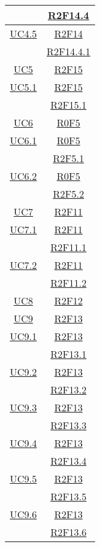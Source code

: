 \begin{longtable}{|c|c|}
& \hyperlink{R2F14.4}{R2F14.4}\\
\hline
\hyperlink{UC4.5}{UC4.5} & \hyperlink{R2F14}{R2F14}\\
& \hyperlink{R2F14.4.1}{R2F14.4.1}\\
\hline
\hyperlink{UC5}{UC5} & \hyperlink{R2F15}{R2F15}\\
\hline
\hyperlink{UC5.1}{UC5.1} & \hyperlink{R2F15}{R2F15}\\
& \hyperlink{R2F15.1}{R2F15.1}\\
\hline
\hyperlink{UC6}{UC6} & \hyperlink{R0F5}{R0F5}\\
\hline
\hyperlink{UC6.1}{UC6.1} & \hyperlink{R0F5}{R0F5}\\
& \hyperlink{R2F5.1}{R2F5.1}\\
\hline
\hyperlink{UC6.2}{UC6.2} & \hyperlink{R0F5}{R0F5}\\
& \hyperlink{R2F5.2}{R2F5.2}\\
\hline
\hyperlink{UC7}{UC7} & \hyperlink{R2F11}{R2F11}\\
\hline
\hyperlink{UC7.1}{UC7.1} & \hyperlink{R2F11}{R2F11}\\
& \hyperlink{R2F11.1}{R2F11.1}\\
\hline
\hyperlink{UC7.2}{UC7.2} & \hyperlink{R2F11}{R2F11}\\
& \hyperlink{R2F11.2}{R2F11.2}\\
\hline
\hyperlink{UC8}{UC8} & \hyperlink{R2F12}{R2F12}\\
\hline
\hyperlink{UC9}{UC9} & \hyperlink{R2F13}{R2F13}\\
\hline
\hyperlink{UC9.1}{UC9.1} & \hyperlink{R2F13}{R2F13}\\
& \hyperlink{R2F13.1}{R2F13.1}\\
\hline
\hyperlink{UC9.2}{UC9.2} & \hyperlink{R2F13}{R2F13}\\
& \hyperlink{R2F13.2}{R2F13.2}\\
\hline
\hyperlink{UC9.3}{UC9.3} & \hyperlink{R2F13}{R2F13}\\
& \hyperlink{R2F13.3}{R2F13.3}\\
\hline
\hyperlink{UC9.4}{UC9.4} & \hyperlink{R2F13}{R2F13}\\
& \hyperlink{R2F13.4}{R2F13.4}\\
\hline
\hyperlink{UC9.5}{UC9.5} & \hyperlink{R2F13}{R2F13}\\
& \hyperlink{R2F13.5}{R2F13.5}\\
\hline
\hyperlink{UC9.6}{UC9.6} & \hyperlink{R2F13}{R2F13}\\
& \hyperlink{R2F13.6}{R2F13.6}\\

\end{longtable}
